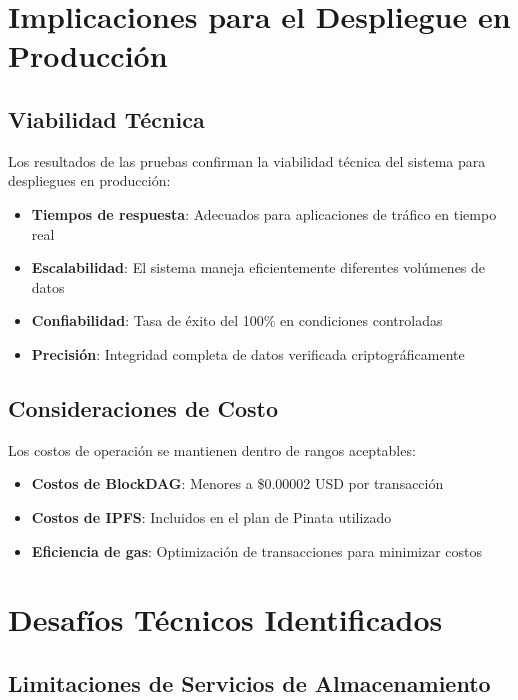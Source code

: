 \documentclass[onecolumn]{article}
\begin{document}
\section{Implicaciones para el Despliegue en Producción}

\subsection{Viabilidad Técnica}

Los resultados de las pruebas confirman la viabilidad técnica del sistema para despliegues en producción:

\begin{itemize}
    \item \textbf{Tiempos de respuesta}: Adecuados para aplicaciones de tráfico en tiempo real
    \item \textbf{Escalabilidad}: El sistema maneja eficientemente diferentes volúmenes de datos
    \item \textbf{Confiabilidad}: Tasa de éxito del 100\% en condiciones controladas
    \item \textbf{Precisión}: Integridad completa de datos verificada criptográficamente
\end{itemize}

\subsection{Consideraciones de Costo}

Los costos de operación se mantienen dentro de rangos aceptables:

\begin{itemize}
    \item \textbf{Costos de BlockDAG}: Menores a \$0.00002 USD por transacción
    \item \textbf{Costos de IPFS}: Incluidos en el plan de Pinata utilizado
    \item \textbf{Eficiencia de gas}: Optimización de transacciones para minimizar costos
\end{itemize}

\section{Desafíos Técnicos Identificados}

\subsection{Limitaciones de Servicios de Almacenamiento}
\end{document}
